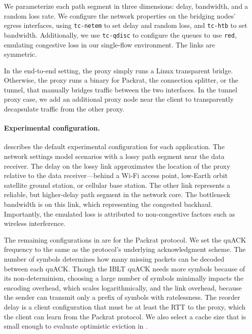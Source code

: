 We parameterize each path segment in three dimensions: delay, bandwidth, and a
random loss rate. We configure the network properties on the bridging nodes’
egress interfaces, using \texttt{tc-netem} to set delay and random loss,
and \texttt{tc-htb} to set bandwidth. Additionally, we use \texttt{tc-qdisc} to
configure the queues to use \texttt{red}, emulating congestive loss in our
single-flow environment. The links are symmetric.

In the end-to-end setting, the proxy simply runs a Linux transparent bridge.
Otherwise, the
proxy runs a binary for Packrat, the connection splitter, or the tunnel, that
manually bridges traffic between the two interfaces.
In the tunnel proxy case, we add an additional proxy
node near the client to transparently decapsulate traffic from the other
proxy.



\paragraph{Experimental configuration.}

 describes the default experimental configuration
for each application. The network settings model scenarios with a lossy path
segment near the data receiver. The delay on the lossy link approximates the
location of the proxy relative to the data receiver---behind a Wi-Fi access
point, low-Earth orbit satellite ground station, or cellular base station.
The other link represents a reliable, but higher-delay path segment in the
network core. The bottleneck bandwidth is on this link, which
representing the congested backhaul. Importantly, the emulated loss is
attributed to non-congestive factors such as wireless interference.

The remaining configurations in  are for the Packrat
protocol. We set the quACK frequency to the same as the protocol's underlying
acknowledgment scheme. The number of symbols determines how many missing
packets can be decoded between each quACK. Though the IBLT quACK needs more symbols
because of its non-determinism, choosing a large number of symbols minimally
impacts the encoding overhead, which scales logarithmically, and the link
overhead, because the sender can transmit only a prefix of symbols
with ratelessness.
The reorder delay is a client configuration that
must be at least the RTT to the proxy, which the client can learn from the Packrat
protocol. We also select a cache size that is small enough to evaluate
optimistic eviction in .

